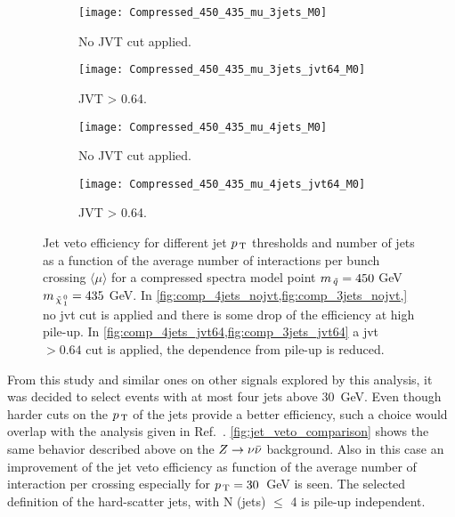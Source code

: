 \begin{figure}[!h]
  \centering
  \begin{subfigure}[t]{.48\linewidth}
    \texttt{[image: Compressed\_450\_435\_mu\_3jets\_M0]}
    \caption{No JVT cut applied.}
    \label{fig:comp_3jets_nojvt}
  \end{subfigure}
  \begin{subfigure}[t]{.48\linewidth}
    \texttt{[image: Compressed\_450\_435\_mu\_3jets\_jvt64\_M0]}
    \caption{JVT > 0.64.}
    \label{fig:comp_3jets_jvt64}
  \end{subfigure}
  \begin{subfigure}[t]{.48\linewidth}
    \texttt{[image: Compressed\_450\_435\_mu\_4jets\_M0]}
    \caption{No JVT cut applied.}
    \label{fig:comp_4jets_nojvt}
  \end{subfigure}
  \begin{subfigure}[t]{.48\linewidth}
    \texttt{[image: Compressed\_450\_435\_mu\_4jets\_jvt64\_M0]}
    \caption{JVT > 0.64.}
    \label{fig:comp_4jets_jvt64}
  \end{subfigure}
  \caption{Jet veto efficiency for different jet $p_\mathrm{\, T}$ thresholds and number of
    jets as a function of the average number of interactions per bunch crossing
    $\langle \mu \rangle$ for a compressed spectra model point $m_{\, \tilde{q}} = 450$
    GeV $m_{\, \tilde{\chi}_{\, 1}^{\, 0}} = 435$ GeV. In
    \cref{fig:comp_4jets_nojvt,fig:comp_3jets_nojvt,} no \gls{jvt} cut is
    applied and there is some drop of the efficiency at high pile-up. In
    \cref{fig:comp_4jets_jvt64,fig:comp_3jets_jvt64} a \gls{jvt} $> 0.64$ cut is
    applied, the dependence from pile-up is reduced.}
  \label{fig:comp_eff}
\end{figure}
From this study and similar ones on other signals explored by this analysis, it
was decided to select events with at most four jets above 30~GeV. Even though
harder cuts on the $p_\mathrm{\, T}$ of the jets provide a better efficiency, such a choice
would overlap with the analysis given in Ref.~\cite{MultijetSUSY}.
\cref{fig:jet_veto_comparison} shows the same behavior described above on the
$Z \rightarrow \nu \bar{\nu}$ background. Also in this case an improvement of the jet veto efficiency
as function of the average number of interaction per crossing especially for
$p_\mathrm{\, T} = 30$~GeV is seen. The selected definition of the hard-scatter jets, with N
(jets) $\leq$ 4 is pile-up independent.
